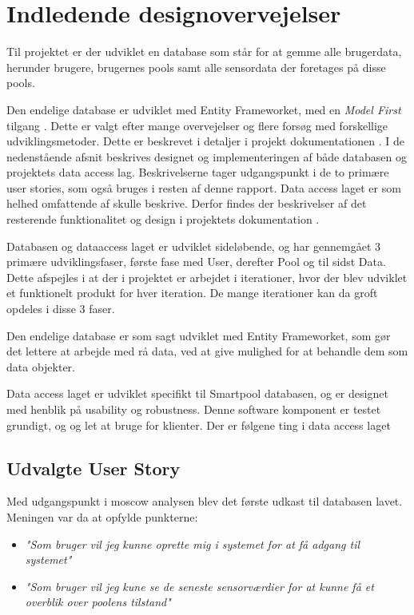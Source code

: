 
\section{Indledende designovervejelser}\label{sec:designdatabase}

Til projektet er der udviklet en database som står for at gemme alle brugerdata, herunder brugere, brugernes pools samt alle sensordata der foretages på disse pools.

Den endelige database er udviklet med Entity Frameworket, med en \textit{Model First} tilgang . Dette er valgt efter mange overvejelser og flere forsøg med forskellige udviklingsmetoder. Dette er beskrevet i detaljer i projekt dokumentationen . I de nedenstående afsnit beskrives designet og implementeringen af både databasen og projektets data access lag. Beskrivelserne tager udgangspunkt i de to primære user stories, som også bruges i resten af denne rapport. Data access laget er som helhed omfattende af skulle beskrive. Derfor findes der beskrivelser af det resterende funktionalitet og design i projektets dokumentation .

Databasen og dataaccess laget er udviklet sideløbende, og har gennemgået 3 primære udviklingsfaser, første fase med User, derefter Pool og til sidst Data. Dette afspejles i at der i projektet er arbejdet i iterationer, hvor der blev udviklet et funktionelt produkt for hver iteration. De mange iterationer kan da groft opdeles i disse 3 faser.

Den endelige database er som sagt udviklet med Entity Frameworket, som gør det lettere at arbejde med rå data, ved at give mulighed for at behandle dem som data objekter.

Data access laget er udviklet specifikt til Smartpool databasen, og er designet med henblik på usability og robustness. Denne software komponent er testet grundigt, og og let at bruge for klienter.
Der er følgene ting i data access laget 
\subsection{Udvalgte User Story}

Med udgangspunkt i \gls{moscow} analysen blev det første udkast til databasen lavet. Meningen var da at opfylde punkterne: 

\begin{itemize}
	\item \textit{"Som bruger vil jeg kunne oprette mig i systemet for at få adgang til systemet"}
	\item \textit{"Som bruger vil jeg kune se de seneste sensorværdier for at kunne få et overblik over poolens tilstand"}
\end{itemize}

